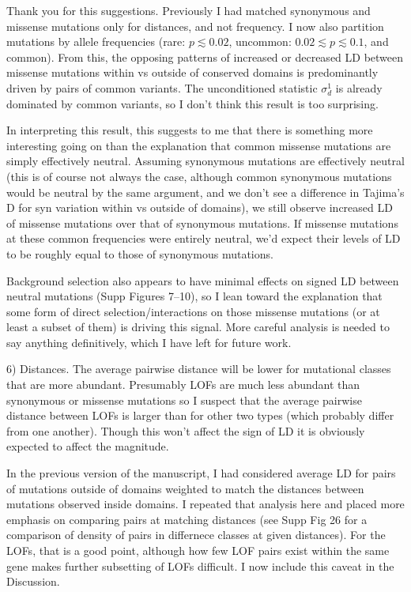 \documentclass{article}
\newenvironment{response}%
  {\list{}{\leftmargin=0.5in\rightmargin=0.5in\color{blue}}\item[]}%
  {\endlist}
\begin{document}
\begin{response}
    Thank you for this suggestions.
    Previously I had matched synonymous and missense mutations only for distances,
    and not frequency. I now also partition mutations by allele frequencies
    (rare: $p\lesssim 0.02$, uncommon: $0.02\lesssim p \lesssim 0.1$, and common).
    From this, the opposing patterns of increased or decreased LD between missense
    mutations within vs outside of conserved domains is predominantly driven by
    pairs of common variants. The unconditioned statistic \(\sigma_d^1\) is
    already dominated by common variants, so I don't think this result is too
    surprising.

    In interpreting this result, this suggests to me that there is something
    more interesting going on than the explanation that common missense
    mutations are simply effectively neutral. Assuming synonymous mutations are
    effectively neutral (this is of course not always the case, although common
    synonymous mutations would be neutral by the same argument, and we don't
    see a difference in Tajima's D for syn variation within vs outside of domains),
    we still observe increased LD of missense mutations over that of synonymous
    mutations. If missense mutations at these common frequencies were entirely
    neutral, we'd expect their levels of LD
    to be roughly equal to those of synonymous mutations.

    Background selection also appears to have minimal effects on signed LD between
    neutral mutations (Supp Figures 7--10), so I lean toward the explanation that
    some form of direct selection/interactions on those missense mutations (or at
    least a subset of them) is driving this signal. More careful analysis is needed
    to say anything definitively, which I have left for future work.
\end{response}

6) Distances. The average pairwise distance will be lower for mutational
classes that are more abundant. Presumably LOFs are much less abundant than
synonymous or missense mutations so I suspect that the average pairwise
distance between LOFs is larger than for other two types (which probably differ
from one another). Though this won't affect the sign of LD it is obviously
expected to affect the magnitude.

\begin{response}
    In the previous version of the manuscript, I had considered average LD for
    pairs of mutations outside of domains weighted to match the distances between
    mutations observed inside domains. I repeated that analysis here and placed
    more emphasis on comparing pairs at matching distances (see Supp Fig 26 for a
    comparison of density of pairs in differnece classes at given distances).
    For the LOFs, that is a good point, although how few LOF pairs exist within
    the same gene makes further subsetting of LOFs difficult.
    I now include this caveat in the Discussion.
\end{response}
\end{document}
